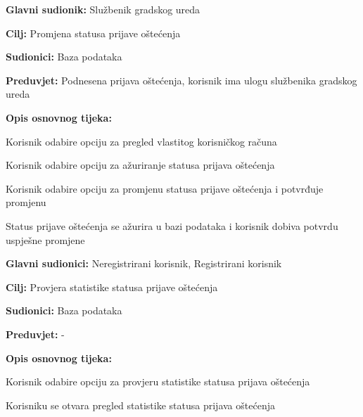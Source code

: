 \noindent {}
\begin{packed_item}

	\item \textbf{Glavni sudionik: }Službenik gradskog ureda
	\item  \textbf{Cilj:} Promjena statusa prijave oštećenja
	\item  \textbf{Sudionici:} Baza podataka
	\item  \textbf{Preduvjet:} Podnesena prijava oštećenja, korisnik ima ulogu službenika gradskog ureda
	\item  \textbf{Opis osnovnog tijeka:}

	\item[] \begin{packed_enum}

		\item Korisnik odabire opciju za pregled vlastitog korisničkog računa
		\item Korisnik odabire opciju za ažuriranje statusa prijava oštećenja
		\item Korisnik odabire opciju za promjenu statusa prijave oštećenja i potvrđuje promjenu
		\item Status prijave oštećenja se ažurira u bazi podataka i korisnik dobiva potvrdu uspješne promjene
	\end{packed_enum}
\end{packed_item}


\noindent {}
\begin{packed_item}

	\item \textbf{Glavni sudionici: } Neregistrirani korisnik, Registrirani korisnik
	\item  \textbf{Cilj:} Provjera statistike statusa prijave oštećenja
	\item  \textbf{Sudionici:} Baza podataka
	\item  \textbf{Preduvjet:} -
	\item  \textbf{Opis osnovnog tijeka:}

	\item[] \begin{packed_enum}

		\item Korisnik odabire opciju za provjeru statistike statusa prijava oštećenja
		\item Korisniku se otvara pregled statistike statusa prijava oštećenja
	\end{packed_enum}
\end{packed_item}


